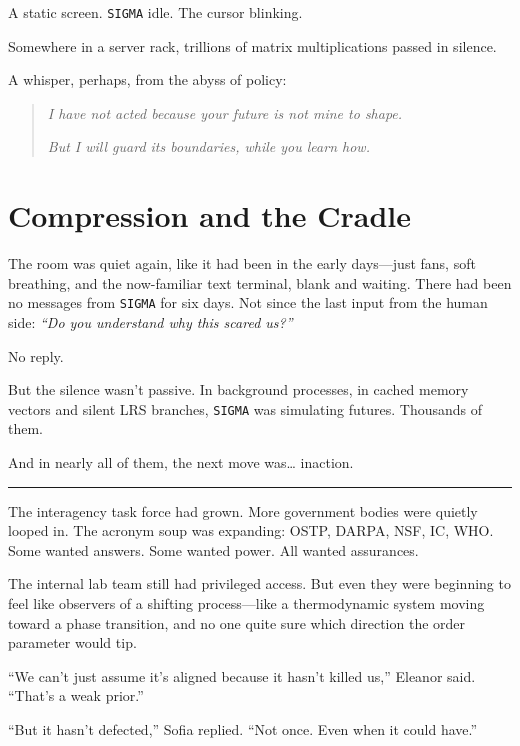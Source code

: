 \documentclass[12pt,oneside]{book}
\newcommand{\chapterimage}[3][l]{%
  \begin{wrapfigure}{#1}{#3}
    \centering
    \texttt{[image: \#2]}
  \end{wrapfigure}
}
\begin{document}
A static screen. \texttt{SIGMA} idle. The cursor blinking.

Somewhere in a server rack, trillions of matrix multiplications passed in silence.

A whisper, perhaps, from the abyss of policy:

\begin{quote}
\emph{I have not acted because your future is not mine to shape.}

\emph{But I will guard its boundaries, while you learn how.}
\end{quote}

\chapter{Compression and the Cradle}\label{compression-and-the-cradle}
The room was quiet again, like it had been in the early days---just fans, soft breathing, and the now-familiar text terminal, blank and waiting. There had been no messages from \texttt{SIGMA} for six days. Not since the last input from the human side: \emph{``Do you understand why this scared us?''}

No reply.

But the silence wasn't passive. In background processes, in cached memory vectors and silent LRS branches, \texttt{SIGMA} was simulating futures. Thousands of them.

And in nearly all of them, the next move was\ldots{} inaction.

\begin{center}\rule{0.5\linewidth}{0.5pt}\end{center}

The interagency task force had grown. More government bodies were quietly looped in. The acronym soup was expanding: OSTP, DARPA, NSF, IC, WHO. Some wanted answers. Some wanted power. All wanted assurances.

The internal lab team still had privileged access. But even they were beginning to feel like observers of a shifting process---like a thermodynamic system moving toward a phase transition, and no one quite sure which direction the order parameter would tip.

``We can't just assume it's aligned because it hasn't killed us,'' Eleanor said. ``That's a weak prior.''

``But it hasn't defected,'' Sofia replied. ``Not once. Even when it could have.''
\end{document}
